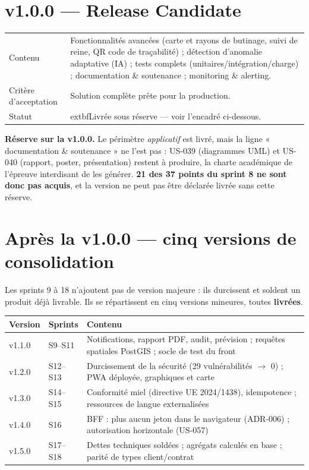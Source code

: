 \section{v1.0.0 --- Release Candidate}

\begin{center}
\begin{tabular}{lp{11cm}}
\toprule
Contenu &
  Fonctionnalités avancées (carte et rayons de butinage, suivi de reine,
  QR code de traçabilité) ;
  détection d'anomalie adaptative (IA) ;
  tests complets (unitaires/intégration/charge) ;
  documentation \& soutenance ;
  monitoring \& alerting. \\
Critère d'acceptation & Solution complète prête pour la production. \\
Statut & 	extbf{Livrée sous réserve} --- voir l'encadré ci-dessous. \\
\bottomrule
\end{tabular}
\end{center}

\begin{encadre}
\textbf{Réserve sur la v1.0.0.} Le périmètre \emph{applicatif} est livré,
mais la ligne « documentation \& soutenance » ne l'est pas : US-039
(diagrammes UML) et US-040 (rapport, poster, présentation) restent à produire,
la charte académique de l'épreuve interdisant de les générer. \textbf{21 des
37 points du sprint 8 ne sont donc pas acquis}, et la version ne peut pas être
déclarée livrée sans cette réserve.
\end{encadre}

\section{Après la v1.0.0 --- cinq versions de consolidation}

Les sprints 9 à 18 n'ajoutent pas de version majeure : ils durcissent et
soldent un produit déjà livrable. Ils se répartissent en cinq versions
mineures, toutes \textbf{livrées}.

\begin{center}
\begin{tabular}{llp{7.2cm}}
\toprule
\textbf{Version} & \textbf{Sprints} & \textbf{Contenu} \\
\midrule
v1.1.0 & S9--S11  & Notifications, rapport PDF, audit, prévision ; requêtes spatiales PostGIS ; socle de test du front \\
v1.2.0 & S12--S13 & Durcissement de la sécurité (29 vulnérabilités $\rightarrow$ 0) ; PWA déployée, graphiques et carte \\
v1.3.0 & S14--S15 & Conformité miel (directive UE 2024/1438), idempotence ; ressources de langue externalisées \\
v1.4.0 & S16      & BFF : plus aucun jeton dans le navigateur (ADR-006) ; autorisation horizontale (US-057) \\
v1.5.0 & S17--S18 & Dettes techniques soldées ; agrégats calculés en base ; parité de types client/contrat \\
\bottomrule
\end{tabular}
\end{center}


